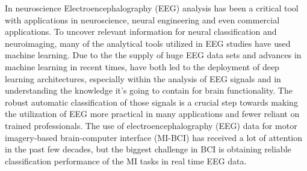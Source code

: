 \documentclass[12pt,a4paper]{report}
\begin{document}
\justify In neuroscience Electroencephalography (EEG) analysis has been a critical tool with applications in neuroscience, neural engineering and even commercial applications. To uncover relevant information for neural classification and neuroimaging, many of the analytical tools utilized in EEG studies have used machine learning. Due to the the supply of huge EEG data sets and advances in machine learning in recent times, have both led to the deployment of deep learning architectures, especially within the analysis of EEG signals and in understanding the knowledge it's going to contain for brain functionality. The robust automatic classification of those signals is a crucial step towards making the utilization of EEG more practical in many applications and fewer reliant on trained professionals. The use of electroencephalography (EEG) data for motor imagery-based brain-computer interface (MI-BCI) has received a lot of attention in the past few decades, but the biggest challenge in BCI is obtaining reliable classification performance of the MI tasks in real time EEG data.

\end{document}
